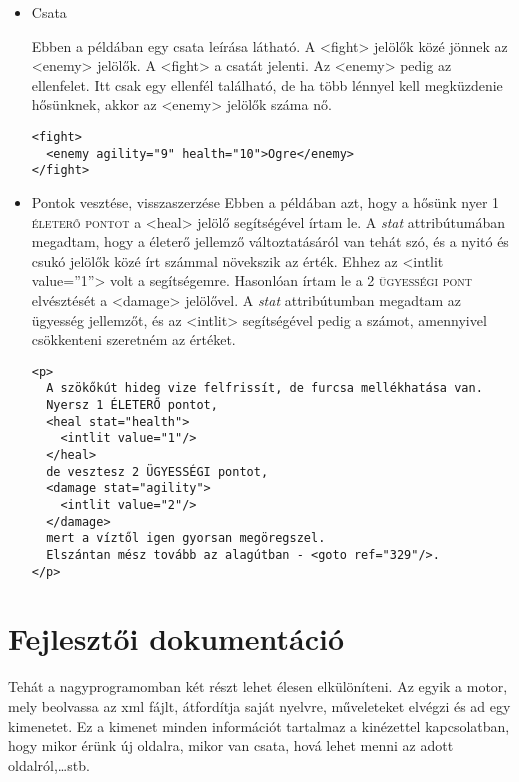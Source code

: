\documentclass[12pt,a4paper,oneside]{report}
\newcommand{\stat}{\textsc}
\newcommand{\attr}{\emph}
\begin{document}
\begin{itemize}
      \item Csata
      
        Ebben a példában egy csata leírása látható. A
        <{\color{Tag}fight}> jelölők közé jönnek az
        <{\color{Tag}enemy}> jelölők. A <{\color{Tag}fight}> a csatát
        jelenti. Az <{\color{Tag}enemy}> pedig az ellenfelet. Itt csak egy ellenfél
        található, de ha több lénnyel kell megküzdenie hősünknek,
        akkor az <{\color{Tag}enemy}> jelölők száma nő.
        \begin{verbatim}
<fight>
  <enemy agility="9" health="10">Ogre</enemy>
</fight>
        \end{verbatim}

      \item Pontok vesztése, visszaszerzése
        Ebben a példában azt, hogy a hősünk nyer 1 \stat{életerő pontot} a
        <{\color{Tag}heal}> jelölő segítségével írtam le. A \attr{stat}
        attribútumában megadtam, hogy a életerő jellemző
        változtatásáról van tehát szó, és a nyitó és csukó jelölők közé írt
        számmal növekszik az érték. Ehhez az <{\color{Tag}intlit}
        {\color{Attr}value}={\color{Value}''1''}> volt a segítségemre.
        Hasonlóan írtam le a 2 \stat{ügyességi pont} elvésztését a <{\color{Tag}damage}>
        jelölővel. A \attr{stat} attribútumban megadtam az ügyesség
        jellemzőt, és az <{\color{Tag}intlit}> segítségével pedig a számot,
        amennyivel csökkenteni szeretném az értéket.
        \begin{verbatim}
<p>
  A szökőkút hideg vize felfrissít, de furcsa mellékhatása van. 
  Nyersz 1 ÉLETERŐ pontot,
  <heal stat="health">
    <intlit value="1"/>
  </heal>      
  de vesztesz 2 ÜGYESSÉGI pontot,
  <damage stat="agility">
    <intlit value="2"/>
  </damage>            
  mert a víztől igen gyorsan megöregszel.
  Elszántan mész tovább az alagútban - <goto ref="329"/>.
</p>
        \end{verbatim}
    \end{itemize}
    
  \section{Fejlesztői dokumentáció}
    Tehát a nagyprogramomban két részt lehet élesen elkülöníteni. Az
    egyik a motor, mely beolvassa az xml fájlt, átfordítja saját
    nyelvre, műveleteket elvégzi és ad egy kimenetet. Ez a kimenet
    minden információt tartalmaz a kinézettel kapcsolatban, hogy
    mikor érünk új oldalra, mikor van csata, hová lehet menni az
    adott oldalról,\dots stb. 
\end{document}

